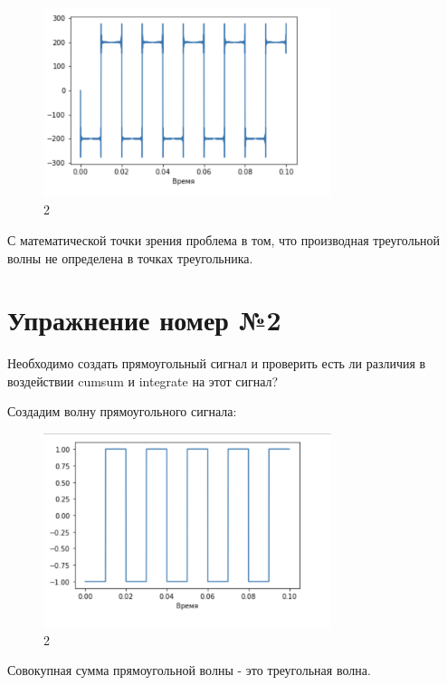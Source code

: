 \documentclass[10pt,a4paper,oneside]{article}
\begin{document}
\begin{figure}[H]
        \centering
        \includegraphics[width=0.75\textwidth]{pics/3.png}
        \caption{2}
        \label{fig:first}
\end{figure}

С математической точки зрения проблема в том, что производная треугольной волны не определена в точках треугольника.

\section{Упражнение номер №2}

Необходимо создать прямоугольный сигнал и проверить есть ли различия в воздействии cumsum и integrate на этот сигнал? 

Создадим волну прямоугольного сигнала:

\begin{figure}[H]
        \centering
        \includegraphics[width=0.75\textwidth]{pics/4.png}
        \caption{2}
        \label{fig:first}
\end{figure}

Совокупная сумма прямоугольной волны - это треугольная волна.
\end{document}
